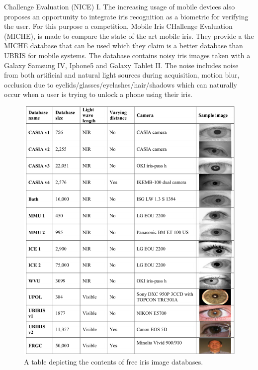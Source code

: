 Challenge Evaluation (NICE) I. The increasing usage of mobile devices also proposes an opportunity to integrate iris recognition as a biometric for verifying the user.  For this purpose a competition, Mobile Iris CHallenge Evaluation (MICHE), is made to compare the state of the art mobile iris. They provide a the MICHE database that can be used which they claim is a better database than UBRIS for mobile systems. The database contains noisy iris images taken with a Galaxy Samsung IV, Iphone5 and Galaxy Tablet II. The noise includes noise from both artificial and natural light sources during acquisition, motion blur, occlusion due to eyelids/glasses/eyelashes/hair/shadows which can naturally occur when a user is trying to unlock a phone using their iris. 

\begin{figure}[h]
\centering
\includegraphics[width=\textwidth]{figures/Iris_Database_tabel_1.png} 
\caption{A table depicting the contents of free iris image databases.}
\label{fig:Iris_database_1}
\end{figure}

